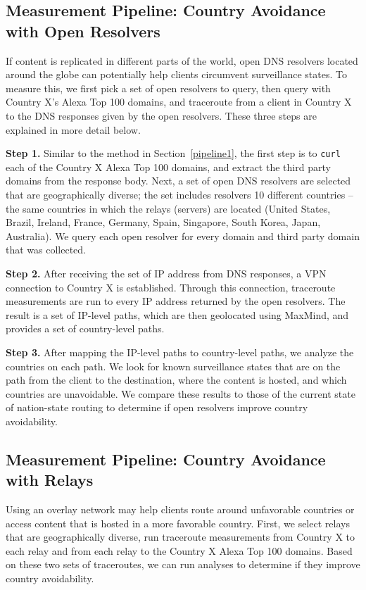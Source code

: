 \subsection{Measurement Pipeline: Country Avoidance with Open Resolvers}
\label{pipeline2}
If content is replicated in different parts of the world, open DNS resolvers located around the globe can potentially help clients circumvent surveillance states.  To measure this, we first pick a set of open resolvers to query, then query with Country X's Alexa Top 100 domains, and traceroute from a client in Country X to the DNS responses given by the open resolvers.  These three steps are explained in more detail below.

{\bf Step 1.}  Similar to the method in Section~\ref{pipeline1}, the first step is to {\tt curl} each of the Country X Alexa Top 100 domains, and extract the third party domains from the response body.  Next, a set of open DNS resolvers are selected that are geographically diverse; the set includes resolvers 10 different countries -- the same countries in which the relays (servers) are located (United States, Brazil, Ireland, France, Germany, Spain, Singapore, South Korea, Japan, Australia).  We query each open resolver for every domain and third party domain that was collected.

{\bf Step 2.}  After receiving the set of IP address from DNS responses, a VPN connection to Country X is established.  Through this connection, traceroute measurements are run to every IP address returned by the open resolvers. The result is a set of IP-level paths, which are then geolocated using MaxMind, and provides a set of country-level paths.

{\bf Step 3.}  After mapping the IP-level paths to country-level paths, we analyze the countries on each path.  We look for known surveillance states that are on the path from the client to the destination, where the content is hosted, and which countries are unavoidable.  We compare these results to those of the current state of nation-state routing to determine if open resolvers improve country avoidability.

\subsection{Measurement Pipeline: Country Avoidance with Relays}
Using an overlay network may help clients route around unfavorable countries or access content that is hosted in a more favorable country.  First, we select relays that are geographically diverse, run traceroute measurements from Country X to each relay and from each relay to the Country X Alexa Top 100 domains.  Based on these two sets of traceroutes, we can run analyses to determine if they improve country avoidability.

